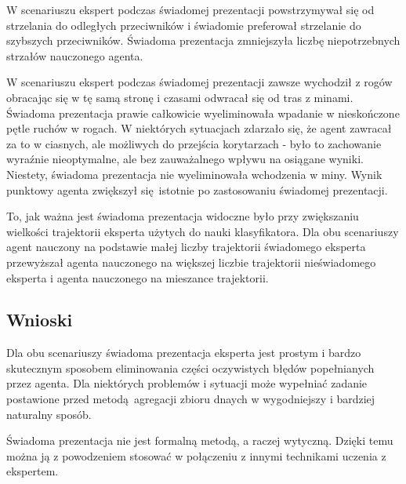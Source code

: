 W scenariuszu  ekspert podczas świadomej prezentacji powstrzymywał się od strzelania do odległych przeciwników i świadomie preferował strzelanie do szybszych przeciwników. Świadoma prezentacja zmniejszyła liczbę niepotrzebnych strzałów nauczonego agenta.

W scenariuszu  ekspert podczas świadomej prezentacji zawsze wychodził z rogów obracając się w tę samą stronę i czasami odwracał się od tras z minami. Świadoma prezentacja prawie całkowicie wyeliminowała wpadanie w nieskończone pętle ruchów w rogach. W niektórych sytuacjach zdarzało się, że agent zawracał za to w ciasnych, ale możliwych do przejścia korytarzach - było to zachowanie wyraźnie nieoptymalne, ale bez zauważalnego wpływu na osiągane wyniki. Niestety, świadoma prezentacja nie wyeliminowała wchodzenia w miny. Wynik punktowy agenta zwiększył się istotnie po zastosowaniu świadomej prezentacji.

To, jak ważna jest świadoma prezentacja widoczne było przy zwiększaniu wielkości trajektorii eksperta użytych do nauki klasyfikatora. Dla obu scenariuszy agent nauczony na podstawie małej liczby trajektorii świadomego eksperta przewyższał agenta nauczonego na większej liczbie trajektorii nieświadomego eksperta i agenta nauczonego na mieszance trajektorii. 
 
\subsection{Wnioski}

Dla obu scenariuszy świadoma prezentacja eksperta jest prostym i bardzo skutecznym sposobem eliminowania części oczywistych błędów popełnianych przez agenta. Dla niektórych problemów i sytuacji może wypełniać zadanie postawione przed metodą agregacji zbioru dnaych w wygodniejszy i bardziej naturalny sposób.

Świadoma prezentacja nie jest formalną metodą, a raczej wytyczną. Dzięki temu można ją z powodzeniem stosować w połączeniu z innymi technikami uczenia z ekspertem.
